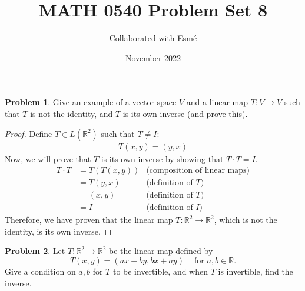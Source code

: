 \documentclass[12pt,reqno]{article}
\title{MATH 0540 Problem Set 8}
\author{Collaborated with Esmé}
\date{November 2022}
\theoremstyle{definition}
\newtheorem{problem}{Problem}
\begin{document}
\maketitle


\begin{problem}
    Give an example of a vector space $V$ and a linear map $T:V\rightarrow V$ such that $T$ is not the identity, and $T$ is its own inverse (and prove this).
\end{problem}

\begin{proof}
    Define $T \in L(\mathbb{R}^2)$ such that $T\neq I$:
    \begin{align*}
        T(x, y) = (y, x)
    \end{align*}
    Now, we will prove that $T$ is its own inverse by showing that $T\cdot T = I$.
    \begin{align*}
        T\cdot T &= T(T(x, y)) &\text{(composition of linear maps)}\\
        &= T(y, x) &\text{(definition of $T$)}\\
        &= (x, y) &\text{(definition of $T$)}\\
        &= I &\text{(definition of $I$)}
    \end{align*}
    Therefore, we have proven that the linear map $T: \mathbb{R}^2 \rightarrow \mathbb{R}^2$, which is not the identity, is its own inverse. 
\end{proof}

\newpage


\begin{problem}
    Let $T:\mathbb{R}^2 \rightarrow \mathbb{R}^2$ be the linear map defined by
    $$
    T(x,y) = (ax + by, bx + ay)\ \ \ \ \text{    for }a,b \in \mathbb{R}.
    $$
    Give a condition on $a,b$ for $T$ to be invertible, and when $T$ is invertible, find the inverse.
\end{problem}
\end{document}
